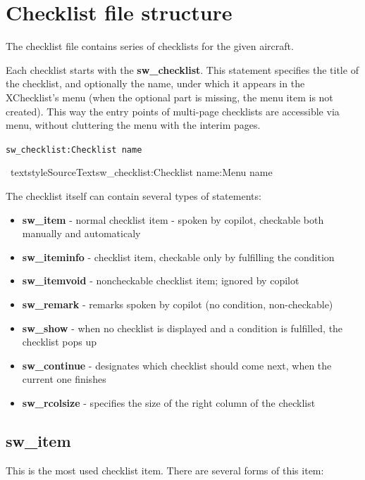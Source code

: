 \documentclass[11pt,parskip=half,a4paper]{scrartcl}
\newcommand\textstyleStrongEmphasis[1]{\textbf{#1}}
\newcommand\textstyleSourceText[1]{\texttt{#1}}
\begin{document}
\section{Checklist file structure}

The checklist file contains series of checklists for the given aircraft.

Each checklist starts with the \textstyleStrongEmphasis{sw\_checklist}. This statement specifies the title of the checklist, and optionally the name, under which it appears in the XChecklist's menu (when the optional part is missing, the menu item is not created). This way the {\textquotedbl}entry points{\textquotedbl} of multi-page checklists are accessible via menu, without cluttering the menu with the interim pages.

\textstyleSourceText{sw\_checklist:Checklist name}

\ textstyleSourceText{sw\_checklist:Checklist name:Menu name}

The checklist itself can contain several types of statements:

\begin{itemize}
\item \textstyleStrongEmphasis{sw\_item} - normal checklist item - spoken by copilot, checkable both manually and automaticaly 
\item \textstyleStrongEmphasis{sw\_iteminfo} - checklist item, checkable only by fulfilling the condition 
\item \textstyleStrongEmphasis{sw\_itemvoid} - noncheckable checklist item; ignored by copilot 
\item \textstyleStrongEmphasis{sw\_remark} - remarks spoken by copilot (no condition, non-checkable) 
\item \textstyleStrongEmphasis{sw\_show} - when no checklist is displayed and a condition is fulfilled, the checklist pops up 
\item \textstyleStrongEmphasis{sw\_continue} - designates which checklist should come next, when the current one
finishes 
\item \textstyleStrongEmphasis{sw\_rcolsize} - specifies the size of the {\textquotedbl}right column{\textquotedbl} of the checklist 
\end{itemize}
\subsection{sw\_item}
This is the most used checklist item. There are several forms of this item:
\end{document}
